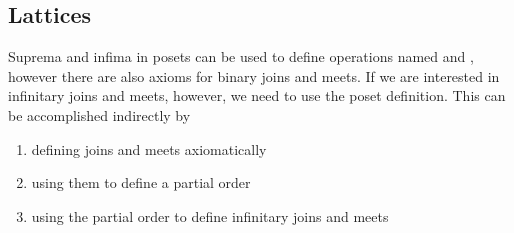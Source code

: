 \subsection{Lattices}\label{sec:lattices}

\begin{note}\label{note:infinite_join_meet}
  Suprema and infima in posets can be used to define operations named  and , however there are also axioms for binary joins and meets. If we are interested in infinitary joins and meets, however, we need to use the poset definition. This can be accomplished indirectly by
  \begin{enumerate}
    \item defining joins and meets axiomatically
    \item using them to define a partial order
    \item using the partial order to define infinitary joins and meets
  \end{enumerate}
\end{note}

